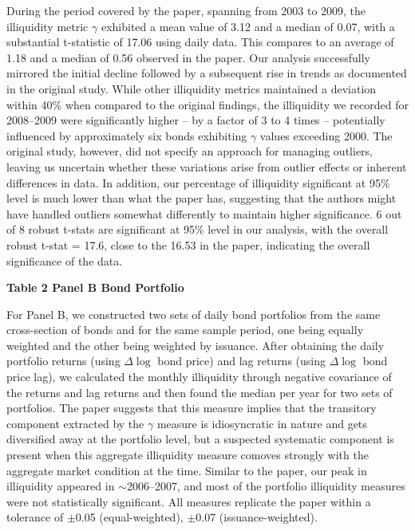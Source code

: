 \documentclass{article}
\begin{document}
During the period covered by the paper, spanning from 2003 to 2009, the illiquidity metric $\gamma$ exhibited a mean value of 3.12 and a median of 0.07, with a substantial t-statistic of 17.06 using daily data. This compares to an average of 1.18 and a median of 0.56 observed in the paper. Our analysis successfully mirrored the initial decline followed by a subsequent rise in trends as documented in the original study. While other illiquidity metrics maintained a deviation within 40\% when compared to the original findings, the illiquidity we recorded for 2008--2009 were significantly higher -- by a factor of 3 to 4 times -- potentially influenced by approximately six bonds exhibiting $\gamma$ values exceeding 2000. The original study, however, did not specify an approach for managing outliers, leaving us uncertain whether these variations arise from outlier effects or inherent differences in data. In addition, our percentage of illiquidity significant at 95\% level is much lower than what the paper has, suggesting that the authors might have handled outliers somewhat differently to maintain higher significance. 6 out of 8 robust t-stats are significant at 95\% level in our analysis, with the overall robust t-stat = 17.6, close to the 16.53 in the paper, indicating the overall significance of the data.


\textbf{\large Table 2 Panel B Bond Portfolio}

For Panel B, we constructed two sets of daily bond portfolios from the same cross-section of bonds and for the same sample period, one being equally weighted and the other being weighted by issuance. After obtaining the daily portfolio returns (using $\Delta \log$ bond price) and lag returns (using $\Delta \log$ bond price lag), we calculated the monthly illiquidity through negative covariance of the returns and lag returns and then found the median per year for two sets of portfolios. The paper suggests that this measure implies that the transitory component extracted by the $\gamma$ measure is idiosyncratic in nature and gets diversified away at the portfolio level, but a suspected systematic component is present when this aggregate illiquidity measure comoves strongly with the aggregate market condition at the time. Similar to the paper, our peak in illiquidity appeared in $\sim$2006--2007, and most of the portfolio illiquidity measures were not statistically significant. All measures replicate the paper within a tolerance of $\pm$0.05 (equal-weighted), $\pm$0.07 (issuance-weighted).
\end{document}
